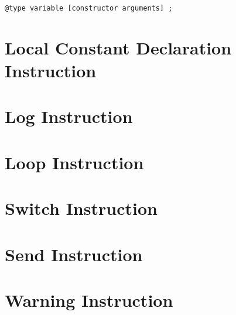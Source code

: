 {
\begin{lstlisting}[language=galgas]
@type variable [constructor arguments] ;
\end{lstlisting}
}


\section{Local Constant Declaration Instruction}




\section{Log Instruction}




\section{Loop Instruction}












\section{Switch Instruction}




\section{Send Instruction}




\section{Warning Instruction}



